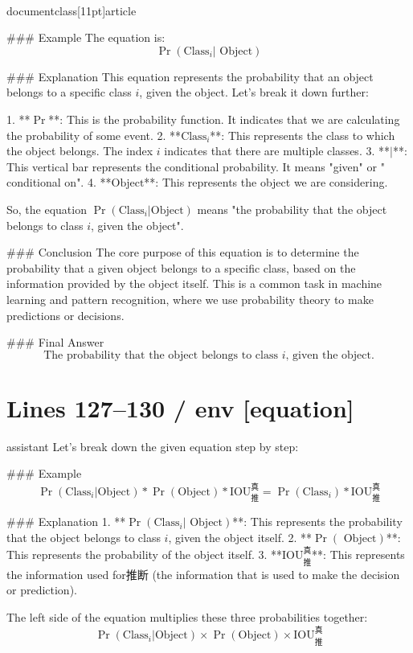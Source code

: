 \\documentclass[11pt]{article}
\begin{document}
### Example
The equation is:
\[
\Pr(\textrm{Class}_i | \textrm{ Object})
\]

### Explanation
This equation represents the probability that an object belongs to a specific class \(i\), given the object. Let's break it down further:

1. **\(\Pr\)**: This is the probability function. It indicates that we are calculating the probability of some event.
2. **\(\textrm{Class}_i\)**: This represents the class to which the object belongs. The index \(i\) indicates that there are multiple classes.
3. **\(|\)**: This vertical bar represents the conditional probability. It means "given" or " conditional on".
4. **\(\textrm{Object}\)**: This represents the object we are considering.

So, the equation \(\Pr(\textrm{Class}_i | \textrm{Object})\) means "the probability that the object belongs to class \(i\), given the object".

### Conclusion
The core purpose of this equation is to determine the probability that a given object belongs to a specific class, based on the information provided by the object itself. This is a common task in machine learning and pattern recognition, where we use probability theory to make predictions or decisions.

### Final Answer
\[
\boxed{\text{The probability that the object belongs to class } i \text{, given the object.}}
\]


\section*{Lines 127–130 / env [equation]}
assistant
Let's break down the given equation step by step:

### Example
\[
\Pr(\textrm{Class}_i | \textrm{Object}) * \Pr(\textrm{Object}) * \textrm{IOU}_{\textrm{推}}^{\textrm{真}} = \Pr(\textrm{Class}_i) * \textrm{IOU}_{\textrm{推}}^{\textrm{真}}
\]

### Explanation
1. **\(\Pr(\textrm{Class}_i | \textrm{ Object})\)**: This represents the probability that the object belongs to class \(i\), given the object itself.
2. **\(\Pr(\textrm{ Object})\)**: This represents the probability of the object itself.
3. **\(\textrm{IOU}_{\textrm{推}}^{\textrm{真}}\)**: This represents the information used for推断 (the information that is used to make the decision or prediction).

The left side of the equation multiplies these three probabilities together:
\[
\Pr(\textrm{Class}_i | \textrm{Object}) \times \Pr(\textrm{Object}) \times \textrm{IOU}_{\textrm{推}}^{\textrm{真}}
\]
\end{document}
